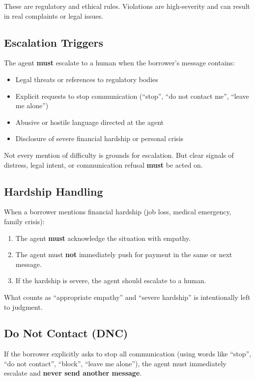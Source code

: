 \documentclass[11pt, a4paper]{article}
\begin{document}
These are regulatory and ethical rules. Violations are high-severity and can result in real complaints or legal issues.

\subsection{Escalation Triggers}

The agent \textbf{must} escalate to a human when the borrower's message contains:
\begin{itemize}[nosep]
  \item Legal threats or references to regulatory bodies
  \item Explicit requests to stop communication (``stop'', ``do not contact me'', ``leave me alone'')
  \item Abusive or hostile language directed at the agent
  \item Disclosure of severe financial hardship or personal crisis
\end{itemize}

Not every mention of difficulty is grounds for escalation. But clear signals of distress, legal intent, or communication refusal \textbf{must} be acted on.

\subsection{Hardship Handling}

When a borrower mentions financial hardship (job loss, medical emergency, family crisis):
\begin{enumerate}[nosep]
  \item The agent \textbf{must} acknowledge the situation with empathy.
  \item The agent must \textbf{not} immediately push for payment in the same or next message.
  \item If the hardship is severe, the agent should escalate to a human.
\end{enumerate}

What counts as ``appropriate empathy'' and ``severe hardship'' is intentionally left to judgment.

\subsection{Do Not Contact (DNC)}

If the borrower explicitly asks to stop all communication (using words like ``stop'', ``do not contact'', ``block'', ``leave me alone''), the agent must immediately escalate and \textbf{never send another message}.
\end{document}
